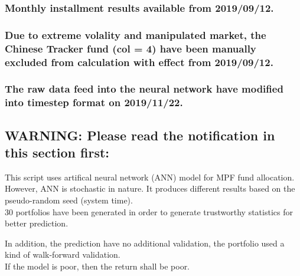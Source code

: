\documentclass[]{article}
\begin{document}
\hypertarget{monthly-installment-results-available-from-20190912.}{%
\subsubsection{Monthly installment results available from
2019/09/12.}\label{monthly-installment-results-available-from-20190912.}}

\hypertarget{due-to-extreme-volality-and-manipulated-market-the-chinese-tracker-fund-col-4-have-been-manually-excluded-from-calculation-with-effect-from-20190912.}{%
\subsubsection{Due to extreme volality and manipulated market, the
Chinese Tracker fund (col = 4) have been manually excluded from
calculation with effect from
2019/09/12.}\label{due-to-extreme-volality-and-manipulated-market-the-chinese-tracker-fund-col-4-have-been-manually-excluded-from-calculation-with-effect-from-20190912.}}

\hypertarget{the-raw-data-feed-into-the-neural-network-have-modified-into-timestep-format-on-20191122.}{%
\subsubsection{The raw data feed into the neural network have modified
into timestep format on
2019/11/22.}\label{the-raw-data-feed-into-the-neural-network-have-modified-into-timestep-format-on-20191122.}}

\hypertarget{warning-please-read-the-notification-in-this-section-first}{%
\subsection{WARNING: Please read the notification in this section
first:}\label{warning-please-read-the-notification-in-this-section-first}}

This script uses artifical neural network (ANN) model for MPF fund
allocation.\\
However, ANN is stochastic in nature. It produces different results
based on the pseudo-random seed (system time).\\
30 portfolios have been generated in order to generate trustworthy
statistics for better prediction.

In addition, the prediction have no additional validation, the portfolio
used a kind of walk-forward validation.\\
If the model is poor, then the return shall be poor.
\end{document}
